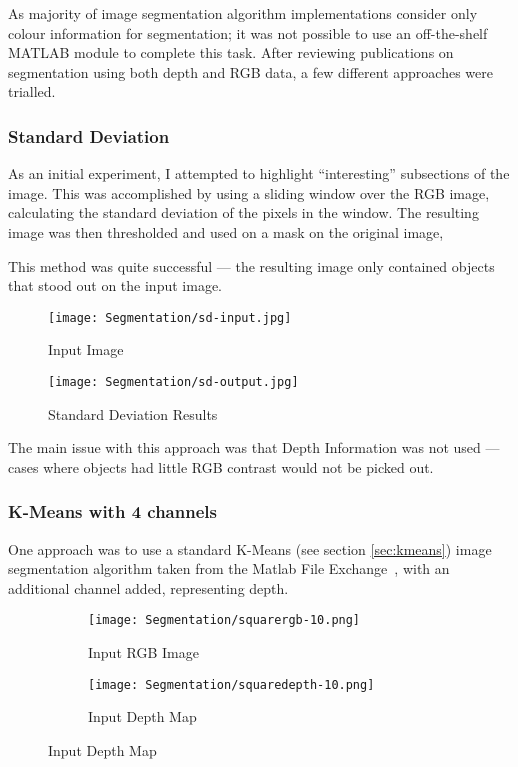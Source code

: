 As majority of image segmentation algorithm implementations consider only colour information for segmentation; it was not possible to use an off-the-shelf MATLAB module to complete this task. After reviewing publications on segmentation using both depth and RGB data, a few different approaches were trialled.

\subsubsection{Standard Deviation}
As an initial experiment, I attempted to highlight ``interesting'' subsections of the image. This was accomplished by using a sliding window over the RGB image, calculating the standard deviation of the pixels in the window. The resulting image was then thresholded and used on a mask on the original image,

This method was quite successful --- the resulting image only contained objects that stood out on the input image.

\begin{figure}[H]
    \centering
    \texttt{[image: Segmentation/sd-input.jpg]}
    \caption{Input Image}
\end{figure}

\begin{figure}[H]
   \centering
   \texttt{[image: Segmentation/sd-output.jpg]}
   \caption{Standard Deviation Results}

\end{figure}

The main issue with this approach was that Depth Information was not used --- cases where objects had little RGB contrast would not be picked out. 

\subsubsection{K-Means with 4 channels}
One approach was to use a standard K-Means (see section \ref{sec:kmeans}) image segmentation algorithm taken from the Matlab File Exchange~\cite{kmeans-matlab}, with an additional channel added, representing depth. 

\begin{figure}[H]
    \centering
    \begin{subfigure}[b]{0.45\textwidth}
        \centering
        \texttt{[image: Segmentation/squarergb-10.png]}
        \caption{Input RGB Image}
    \end{subfigure}
    \hfill
    \begin{subfigure}[b]{0.45\textwidth}
        \centering
        \texttt{[image: Segmentation/squaredepth-10.png]}
        \caption{Input Depth Map}
    \end{subfigure}
\end{figure}

